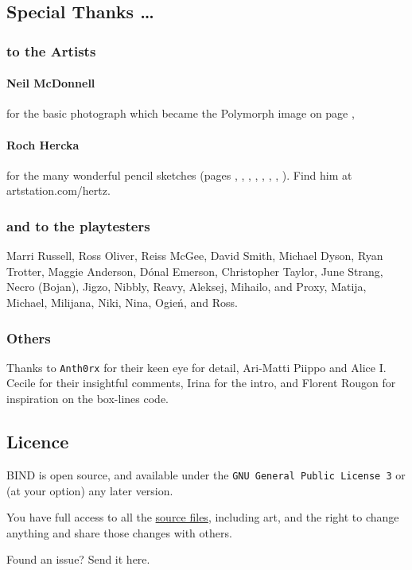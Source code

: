 \begin{multicols}{2}
\subsection*{Special Thanks \ldots}

\subsubsection*{to the Artists}

\paragraph{Neil McDonnell} for the basic photograph which became the Polymorph image on page \pageref{Roch_Hercka/polymorph},

\paragraph{Roch Hercka} for the many wonderful pencil sketches (pages 
\pageref{Roch_Hercka/cave_fight}, 
\pageref{Roch_Hercka/dwarf_encumbrance}, 
\pageref{Roch_Hercka/vitals_shot}, 
\pageref{Roch_Hercka/stances}, 
\pageref{Roch_Hercka/conjuration_right}, 
\pageref{Roch_Hercka/dwarvish_runes}, 
\pageref{Roch_Hercka/polymorph}, 
\pageref{Roch_Hercka/flashing_light}).
Find him at artstation.com/hertz.

\subsubsection*{and to the playtesters} Marri Russell, Ross Oliver, Reiss McGee, David Smith, Michael Dyson, Ryan Trotter, Maggie Anderson, 
D\'{o}nal Emerson, Christopher Taylor, June Strang, 
Necro (Bojan), Jigzo, Nibbly, Reavy, 
Aleksej, Mihailo, and Proxy,
Matija, Michael, Milijana, Niki, Nina, Ogie\'n,
and Ross.

\subsubsection*{Others}
Thanks to
\texttt{Anth0rx} for their keen eye for detail,
Ari-Matti Piippo and Alice I. Cecile for their insightful comments,
Irina for the intro,
and Florent Rougon for inspiration on the box-lines code.

\subsection*{Licence}

BIND is open source, and available under the {\tt GNU General Public License 3} or (at your option) any later version.

You have full access to all the \href{https://gitlab.com/bindrpg/core}{source files}, including art, and the right to change anything and share those changes with others.

\begin{center}
  
  Found an issue?
  Send it here.
\end{center}

\end{multicols}
